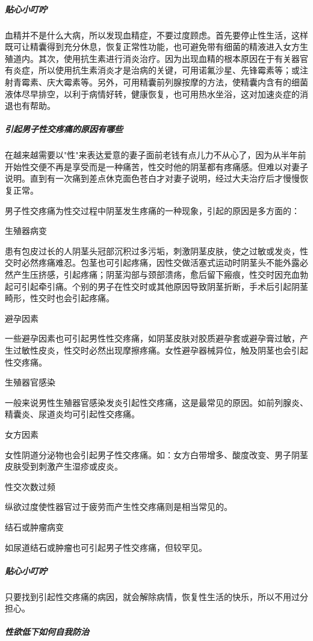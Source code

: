 \begin{enumerate}
\subparagraph{贴心小叮咛}

血精并不是什么大病，所以发现血精症，不要过度顾虑。首先要停止性生活，这样既可让精囊得到充分休息，恢复正常性功能，也可避免带有细菌的精液进入女方生殖道内。其次，使用抗生素进行消炎治疗。因为出现血精的根本原因在于有关器官有炎症，所以使用抗生素消炎才是治病的关键，可用诺氟沙星、先锋霉素等；或注射青霉素、庆大霉素等。另外，可用精囊前列腺按摩的方法，使精囊内含有的细菌液体尽早排空，以利于病情好转，健康恢复，也可用热水坐浴，这对加速炎症的消退也有帮助。

\subparagraph{引起男子性交疼痛的原因有哪些}

在越来越需要以"性"来表达爱意的妻子面前老钱有点儿力不从心了，因为从半年前开始性交便不再是享受而是一种痛苦，性交时他的阴茎都有疼痛感。但难以对妻子说明。直到有一次痛到差点休克面色苍白才对妻子说明，经过大夫治疗后才慢慢恢复正常。

男子性交疼痛为性交过程中阴茎发生疼痛的一种现象，引起的原因是多方面的：

生殖器病变

患有包皮过长的人阴茎头冠部沉积过多污垢，刺激阴茎皮肤，使之过敏或发炎，性交时必然疼痛难忍。包茎也可引起疼痛，因性交做活塞式运动时阴茎头不能外露必然产生压挤感，引起疼痛；阴茎沟部与颈部溃疡，愈后留下瘢痕，性交时因充血勃起可引起牵引痛。个别的男子在性交时或其他原因导致阴茎折断，手术后引起阴茎畸形，性交时也会引起疼痛。

避孕因素

一些避孕因素也可引起男性性交疼痛，如阴茎皮肤对胶质避孕套或避孕膏过敏，产生过敏性皮炎，性交时必然出现摩擦疼痛。女性避孕器械异位，触及阴茎也会引起性交疼痛。

生殖器官感染

一般来说男性生殖器官感染发炎引起性交疼痛，这是最常见的原因。如前列腺炎、精囊炎、尿道炎均可引起性交疼痛。

女方因素

女性阴道分泌物也会引起男子性交疼痛。如：女方白带增多、酸度改变、男子阴茎皮肤受到刺激产生湿疹或皮炎。

性交次数过频

纵欲过度使性器官过于疲劳而产生性交疼痛则是相当常见的。

结石或肿瘤病变

如尿道结石或肿瘤也可引起男子性交疼痛，但较罕见。

\subparagraph{贴心小叮咛}

只要找到引起性交疼痛的病因，就会解除病情，恢复性生活的快乐，所以不用过分担心。

\subparagraph{性欲低下如何自我防治}


\end{enumerate}
